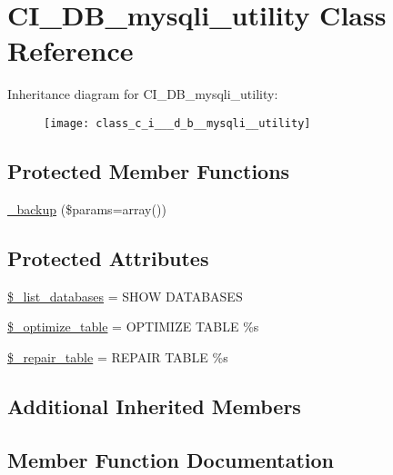 \hypertarget{class_c_i___d_b__mysqli__utility}{}\section{C\+I\+\_\+\+D\+B\+\_\+mysqli\+\_\+utility Class Reference}
\label{class_c_i___d_b__mysqli__utility}
Inheritance diagram for C\+I\+\_\+\+D\+B\+\_\+mysqli\+\_\+utility\+:\begin{figure}[H]
\begin{center}
\leavevmode
\texttt{[image: class\_c\_i\_\_\_d\_b\_\_mysqli\_\_utility]}
\end{center}
\end{figure}
\subsection*{Protected Member Functions}
\begin{DoxyCompactItemize}
\item 
\mbox{\hyperlink{class_c_i___d_b__mysqli__utility_a30f3053d2c82e7562349924363507afa}{\+\_\+backup}} (\$params=array())
\end{DoxyCompactItemize}
\subsection*{Protected Attributes}
\begin{DoxyCompactItemize}
\item 
\mbox{\hyperlink{class_c_i___d_b__mysqli__utility_afe3a5b80562d93d6bc7e2b53c95b7e5a}{\$\+\_\+list\+\_\+databases}} = \textquotesingle{}S\+H\+OW D\+A\+T\+A\+B\+A\+S\+ES\textquotesingle{}
\item 
\mbox{\hyperlink{class_c_i___d_b__mysqli__utility_a083199e5c22c78912dae0a47bb2d7fad}{\$\+\_\+optimize\+\_\+table}} = \textquotesingle{}O\+P\+T\+I\+M\+I\+ZE T\+A\+B\+LE \%s\textquotesingle{}
\item 
\mbox{\hyperlink{class_c_i___d_b__mysqli__utility_a5cf925cbd52e3f6ba5b7ada3fa436efc}{\$\+\_\+repair\+\_\+table}} = \textquotesingle{}R\+E\+P\+A\+IR T\+A\+B\+LE \%s\textquotesingle{}
\end{DoxyCompactItemize}
\subsection*{Additional Inherited Members}


\subsection{Member Function Documentation}
\mbox{\label{class_c_i___d_b__mysqli__utility_a30f3053d2c82e7562349924363507afa}} 
